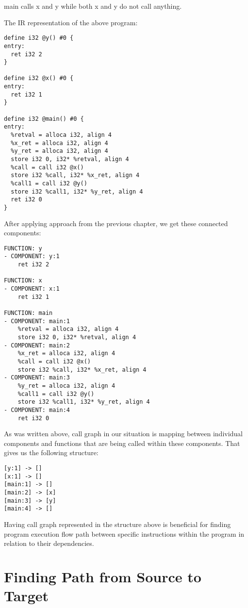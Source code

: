 \documentclass[12pt, twoside]{fithesis2}
\renewcommand{\_}{\leavevmode \kern0.07em\vbox{\hrule width0.4em}}
\begin{document}
main calls x and y while both x and y do not call anything.

The IR representation of the above program:

\begin{verbatim}
define i32 @y() #0 {
entry:
  ret i32 2
}

define i32 @x() #0 {
entry:
  ret i32 1
}

define i32 @main() #0 {
entry:
  %retval = alloca i32, align 4
  %x_ret = alloca i32, align 4
  %y_ret = alloca i32, align 4
  store i32 0, i32* %retval, align 4
  %call = call i32 @x()
  store i32 %call, i32* %x_ret, align 4
  %call1 = call i32 @y()
  store i32 %call1, i32* %y_ret, align 4
  ret i32 0
}
\end{verbatim}

After applying approach from the previous chapter, we get these connected
components:

\begin{verbatim}
FUNCTION: y
- COMPONENT: y:1
    ret i32 2

FUNCTION: x
- COMPONENT: x:1
    ret i32 1

FUNCTION: main
- COMPONENT: main:1
    %retval = alloca i32, align 4
    store i32 0, i32* %retval, align 4
- COMPONENT: main:2
    %x_ret = alloca i32, align 4
    %call = call i32 @x()
    store i32 %call, i32* %x_ret, align 4
- COMPONENT: main:3
    %y_ret = alloca i32, align 4
    %call1 = call i32 @y()
    store i32 %call1, i32* %y_ret, align 4
- COMPONENT: main:4
    ret i32 0
\end{verbatim}

As was written above, call graph in our situation is mapping between individual
components and functions that are being called within these components. That
gives us the following structure:

\begin{verbatim}
[y:1] -> []
[x:1] -> []
[main:1] -> []
[main:2] -> [x]
[main:3] -> [y]
[main:4] -> []
\end{verbatim}

Having call graph represented in the structure above is beneficial for finding
program execution flow path between specific instructions within the program in
relation to their dependencies.

\section{Finding Path from Source to Target}
\label{sec:design-path}
\end{document}
